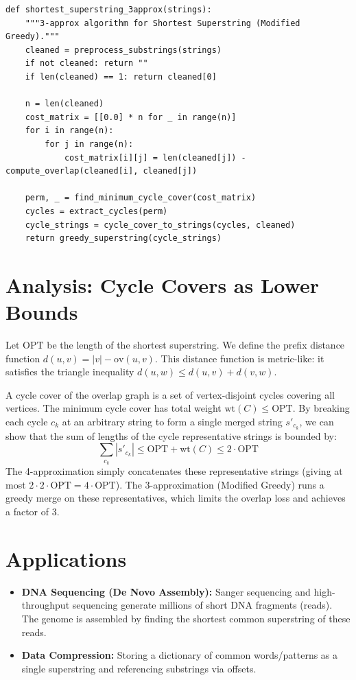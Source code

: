 \begin{lstlisting}[style=python, caption=Approximation Algorithms for Shortest Superstring]
def shortest_superstring_3approx(strings):
    """3-approx algorithm for Shortest Superstring (Modified Greedy)."""
    cleaned = preprocess_substrings(strings)
    if not cleaned: return ""
    if len(cleaned) == 1: return cleaned[0]
        
    n = len(cleaned)
    cost_matrix = [[0.0] * n for _ in range(n)]
    for i in range(n):
        for j in range(n):
            cost_matrix[i][j] = len(cleaned[j]) - compute_overlap(cleaned[i], cleaned[j])
            
    perm, _ = find_minimum_cycle_cover(cost_matrix)
    cycles = extract_cycles(perm)
    cycle_strings = cycle_cover_to_strings(cycles, cleaned)
    return greedy_superstring(cycle_strings)
\end{lstlisting}

\section{Analysis: Cycle Covers as Lower Bounds}
Let $\text{OPT}$ be the length of the shortest superstring. We define the prefix distance function $d(u, v) = |v| - \text{ov}(u, v)$. This distance function is metric-like: it satisfies the triangle inequality $d(u, w) \le d(u, v) + d(v, w)$.

A cycle cover of the overlap graph is a set of vertex-disjoint cycles covering all vertices. The minimum cycle cover has total weight $\text{wt}(C) \le \text{OPT}$. By breaking each cycle $c_k$ at an arbitrary string to form a single merged string $s'_{c_k}$, we can show that the sum of lengths of the cycle representative strings is bounded by:
\[
\sum_{c_k} |s'_{c_k}| \le \text{OPT} + \text{wt}(C) \le 2 \cdot \text{OPT}
\]
The 4-approximation simply concatenates these representative strings (giving at most $2 \cdot 2 \cdot \text{OPT} = 4 \cdot \text{OPT}$). The 3-approximation (Modified Greedy) runs a greedy merge on these representatives, which limits the overlap loss and achieves a factor of 3.

\section{Applications}
\begin{itemize}
    \item \textbf{DNA Sequencing (De Novo Assembly):} Sanger sequencing and high-throughput sequencing generate millions of short DNA fragments (reads). The genome is assembled by finding the shortest common superstring of these reads.
    \item \textbf{Data Compression:} Storing a dictionary of common words/patterns as a single superstring and referencing substrings via offsets.
\end{itemize}

